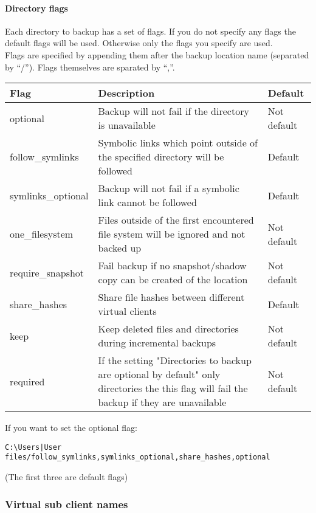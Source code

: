 \documentclass[a4paper,10pt]{article}
\begin{document}
\paragraph{Directory flags}
Each directory to backup has a set of flags. If you do not specify any flags the default flags will be used. Otherwise only the flags you specify are used.\\
Flags are specified by appending them after the backup location name (separated by ``/''). Flags themselves are sparated by ``,''.

\begin{tabular}{|p{}|p{}|p{}|}
\hline
Flag & Description & Default\\
\hline\hline
optional & Backup will not fail if the directory is unavailable & Not default\\
\hline
follow\_symlinks & Symbolic links which point outside of the specified directory will be followed & Default\\
\hline
symlinks\_optional & Backup will not fail if a symbolic link cannot be followed & Default\\
\hline
one\_filesystem & Files outside of the first encountered file system will be ignored and not backed up & Not default \\
\hline
require\_snapshot & Fail backup if no snapshot/shadow copy can be created of the location & Not default\\
\hline
share\_hashes & Share file hashes between different virtual clients & Default\\
\hline
keep & Keep deleted files and directories during incremental backups & Not default\\
\hline
required & If the setting "Directories to backup are optional by default" only directories the this flag will fail the backup if they are unavailable & Not default\\
\hline
\end{tabular}
\par\null\par
\noindent If you want to set the optional flag:
\begin{verbatim}
C:\Users|User files/follow_symlinks,symlinks_optional,share_hashes,optional
\end{verbatim}
(The first three are default flags)

\subsubsection{Virtual sub client names}
\end{document}
